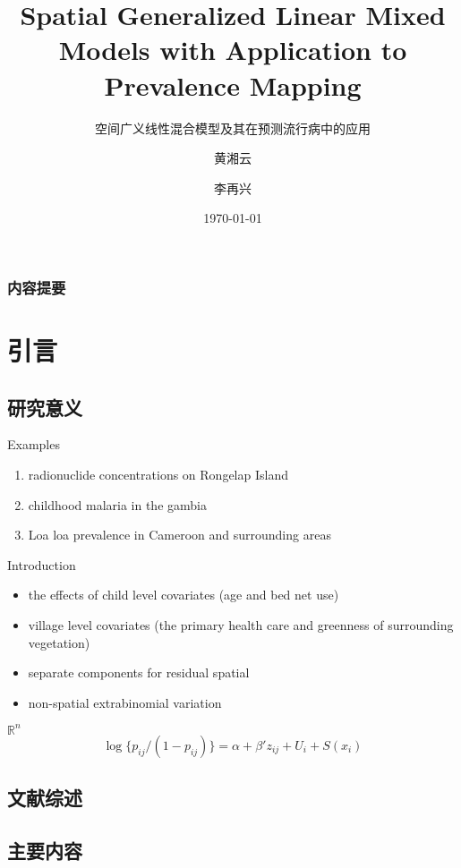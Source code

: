 \documentclass[11pt,compress,xcolor=x11names,UTF8]{beamer}
\title{Spatial Generalized Linear Mixed Models with Application to Prevalence Mapping}
\subtitle{空间广义线性混合模型及其在预测流行病中的应用}
\author{黄湘云 \and 李再兴}
\institute{理学院 \\ 中国矿业大学（北京）}
\date{\today}
\begin{document}
\maketitle

\begin{frame}
  \frametitle{内容提要}
  \tableofcontents  
\end{frame}


\section{引言}


\subsection{研究意义}

\begin{frame}{Examples}

\begin{enumerate}
\item radionuclide concentrations on Rongelap Island
\item childhood malaria in the gambia
\item Loa loa prevalence in Cameroon and surrounding areas
\end{enumerate}

\end{frame}

\begin{frame}{Introduction}
\citet{Diggle2002}
\begin{itemize}
\item the effects of child level covariates (age and bed net use)
\item village level covariates (the primary health care and greenness of surrounding vegetation)
\item separate components for residual spatial
\item non-spatial extrabinomial variation
\end{itemize}
$\mathbb{R}^{n}$
$$ \log \{p_{ij}/(1-p_{ij})\} =\alpha + \beta'z_{ij} + U_{i} + S(x_{i})$$

\end{frame}

\subsection{文献综述}

\subsection{主要内容}
\end{document}
